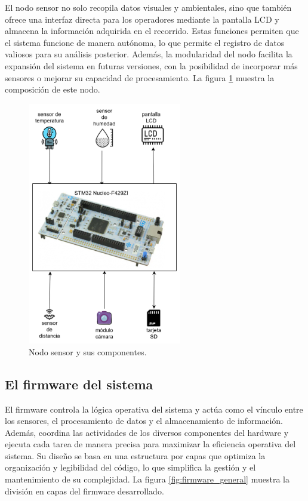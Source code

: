 El nodo sensor no solo recopila datos visuales y ambientales, sino que también ofrece una interfaz directa para los operadores mediante la pantalla LCD y almacena la información adquirida en el recorrido. Estas funciones permiten que el sistema funcione de manera autónoma, lo que permite el registro de datos valiosos para su análisis posterior. Además, la modularidad del nodo facilita la expansión del sistema en futuras versiones, con la posibilidad de incorporar más sensores o mejorar su capacidad de procesamiento. La figura \ref{fig:nodo_sensor} muestra la composición de este nodo.

\vspace{1cm}

\begin{figure}[htbp]
	\centering
	\includegraphics[width=0.6\textwidth, height=0.39\textheight]{./Figures/nodo_sensor.png}
	\caption{Nodo sensor y sus componentes.}
	\label{fig:nodo_sensor}
\end{figure}

\vspace{1cm}

\subsection{El firmware del sistema}

El firmware controla la lógica operativa del sistema y actúa como el vínculo entre los sensores, el procesamiento de datos y el almacenamiento de información. Además, coordina las actividades de los diversos componentes del hardware y ejecuta cada tarea de manera precisa para maximizar la eficiencia operativa del sistema. Su diseño se basa en una estructura por capas que optimiza la organización y legibilidad del código, lo que simplifica la gestión y el mantenimiento de su complejidad. La figura \ref{fig:firmware_general} muestra la división en capas del firmware desarrollado.

